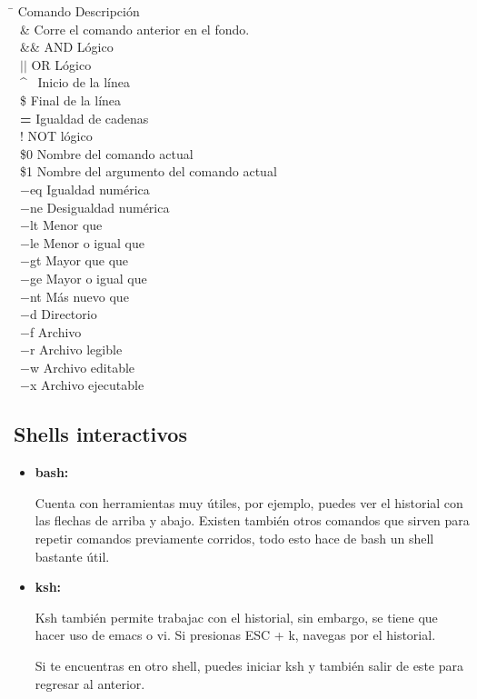 \documentclass[a4paper]{article}
\begin{document}
\begin{tabbing}
\hspace*{2cm} \= \hspace*{5cm} \kill
Comando \> Descripción \\
\ \& \> Corre el comando anterior en el fondo. \\
\ \&\& \> AND Lógico\\
\ $||$ \> OR Lógico\\
\ \^~ \> Inicio de la línea\\
\ \$ \> Final de la línea\\
\ \textbf{=} \> Igualdad de cadenas \\
\ ! \> NOT lógico \\
\ \$0 \> Nombre del comando actual \\
\ \$1 \> Nombre del argumento del comando actual \\
\ $-$eq \> Igualdad numérica \\
\ $-$ne \> Desigualdad numérica \\
\ $-$lt \> Menor que \\
\ $-$le \> Menor o igual que \\
\ $-$gt \> Mayor que que \\
\ $-$ge \> Mayor o igual que \\
\ $-$nt \> Más nuevo que \\
\ $-$d \> Directorio \\
\ $-$f \> Archivo \\
\ $-$r \> Archivo legible \\
\ $-$w \> Archivo editable\\
\ $-$x \> Archivo ejecutable \\
\end{tabbing}

\subsection{Shells interactivos}
\begin{itemize}
\item \textbf{bash:} 

Cuenta con herramientas muy útiles, por ejemplo, puedes ver el historial con las flechas de arriba y abajo. Existen también otros comandos que sirven para repetir comandos previamente corridos, todo esto hace de bash un shell bastante útil.
\item \textbf{ksh:} 

Ksh también permite trabajac con el historial, sin embargo, se tiene que hacer uso de emacs o vi. Si presionas ESC + k, navegas por el historial.

Si te encuentras en otro shell, puedes iniciar ksh y también salir de este para regresar al anterior.
\end{itemize}
\end{document}
